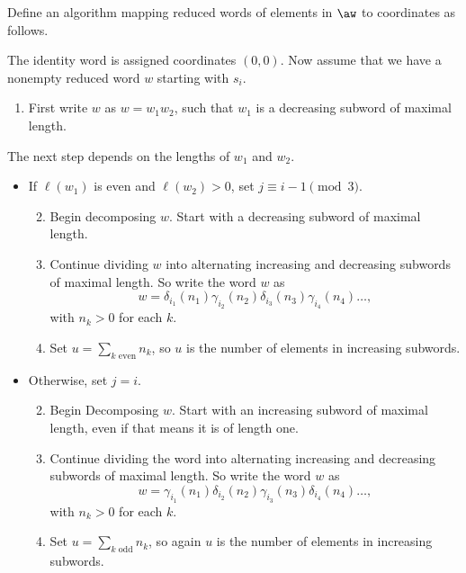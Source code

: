 \documentclass[11pt]{article}
\begin{document}
\begin{algorithm}\label{algorithm}
    Define an algorithm mapping reduced words of elements in $\aw$ to coordinates as follows. 
    
    The identity word is assigned coordinates $(0,0)$. Now assume that we have a nonempty reduced word $w$ starting with $s_i$.
    \begin{enumerate}
        \item  First write $w$ as $w=w_1w_2$, such that $w_1$ is a decreasing subword of maximal length.
    \end{enumerate}
    The next step depends on the lengths of $w_1$ and $w_2$.
    \begin{itemize}
        \item[ - ] If $\ell(w_1)$ is even and $\ell(w_2)>0$,  set $j\equiv i-1\pmod 3$. 
        \begin{enumerate}
            \setcounter{enumi}{1}
            \item Begin decomposing $w$. Start with a decreasing subword of maximal length. 
            \item Continue dividing $w$ into alternating increasing and decreasing subwords of maximal length. So write the word $w$ as 
            \[w=\delta_{i_1}(n_1)\gamma_{i_2}(n_2)\delta_{i_3}(n_3)\gamma_{i_4}(n_4)\hdots,\]
             with $n_k>0$ for each $k$.
             \item Set $u=\sum_{k \text{ even}}n_k$, so $u$ is the number of elements in increasing subwords. 
        \end{enumerate}

    \item [ - ]%
    Otherwise, set $j=i$. 
    \begin{enumerate}
    \setcounter{enumi}{1}
        \item Begin Decomposing $w$. Start with an increasing subword of maximal length, even if that means it is of length one.
        \item Continue dividing the word into alternating increasing and decreasing subwords of maximal length.  So write the word $w$ as \[w=\gamma_{i_1}(n_1)\delta_{i_2}(n_2)\gamma_{i_3}(n_3)\delta_{i_4}(n_4)\hdots,\]
    with $n_k>0$ for each $k$. 
    \item Set $u=\sum_{k \text{ odd}}n_k$, so again $u$ is the number of elements in increasing subwords.  
    \end{enumerate}
    \end{itemize}


\end{algorithm}
\end{document}
